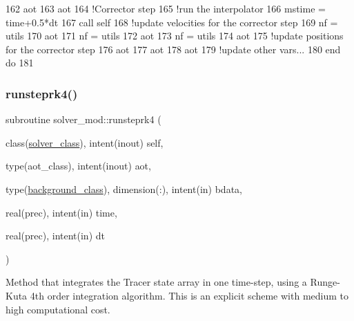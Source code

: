 \begin{DoxyCode}
162         aot%
163         aot%
164         \textcolor{comment}{!Corrector step}
165         \textcolor{comment}{!run the interpolator}
166         mstime = time+0.5*dt
167         \textcolor{keyword}{call }self%
168         \textcolor{comment}{!update velocities for the corrector step}
169         nf = utils%
170         aot%
171         nf = utils%
172         aot%
173         nf = utils%
174         aot%
175         \textcolor{comment}{!update positions for the corrector step}
176         aot%
177         aot%
178         aot%
179         \textcolor{comment}{!update other vars...}
180 \textcolor{keywordflow}{    end do}
181 
\end{DoxyCode}
\mbox{\label{namespacesolver__mod_ae59da54f053ae369d76f130b3790f3b7}} 
\subsubsection{\texorpdfstring{runsteprk4()}{runsteprk4()}}
{\footnotesize\ttfamily subroutine solver\+\_\+mod\+::runsteprk4 (\begin{DoxyParamCaption}\item[{class(\mbox{\hyperlink{structsolver__mod_1_1solver__class}{solver\+\_\+class}}), intent(inout)}]{self,  }\item[{type(aot\+\_\+class), intent(inout)}]{aot,  }\item[{type(\mbox{\hyperlink{structbackground__mod_1_1background__class}{background\+\_\+class}}), dimension(\+:), intent(in)}]{bdata,  }\item[{real(prec), intent(in)}]{time,  }\item[{real(prec), intent(in)}]{dt }\end{DoxyParamCaption})\hspace{0.3cm}{\ttfamily [private]}}



Method that integrates the Tracer state array in one time-\/step, using a Runge-\/\+Kuta 4th order integration algorithm. This is an explicit scheme with medium to high computational cost. 

